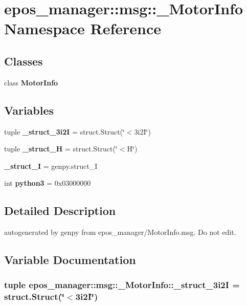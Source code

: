 \section{epos\-\_\-manager\-:\-:msg\-:\-:\-\_\-\-Motor\-Info \-Namespace \-Reference}
\label{namespaceepos__manager_1_1msg_1_1__MotorInfo}
\subsection*{\-Classes}
\begin{DoxyCompactItemize}
\item 
class {\bf \-Motor\-Info}
\end{DoxyCompactItemize}
\subsection*{\-Variables}
\begin{DoxyCompactItemize}
\item 
tuple {\bf \-\_\-struct\-\_\-3i2\-I} = struct.\-Struct(\char`\"{}$<$3i2\-I\char`\"{})
\item 
tuple {\bf \-\_\-struct\-\_\-\-H} = struct.\-Struct(\char`\"{}$<$\-H\char`\"{})
\item 
{\bf \-\_\-struct\-\_\-\-I} = genpy.\-struct\-\_\-\-I
\item 
int {\bf python3} = 0x03000000
\end{DoxyCompactItemize}


\subsection{\-Detailed \-Description}
\begin{DoxyVerb}autogenerated by genpy from epos_manager/MotorInfo.msg. Do not edit.\end{DoxyVerb}
 

\subsection{\-Variable \-Documentation}
\subsubsection[{\-\_\-struct\-\_\-3i2\-I}]{\setlength{\rightskip}{0pt plus 5cm}tuple {\bf epos\-\_\-manager\-::msg\-::\-\_\-\-Motor\-Info\-::\-\_\-struct\-\_\-3i2\-I} = struct.\-Struct(\char`\"{}$<$3i2\-I\char`\"{})}\label{namespaceepos__manager_1_1msg_1_1__MotorInfo_a55df7a22650f17756ca12a581ca11d70}


